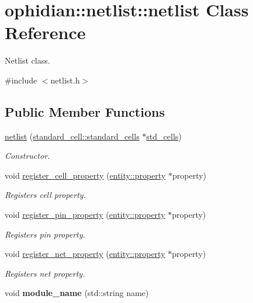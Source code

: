 \hypertarget{classophidian_1_1netlist_1_1netlist}{\section{ophidian\-:\-:netlist\-:\-:netlist Class Reference}
\label{classophidian_1_1netlist_1_1netlist}
}


Netlist class.  




{\ttfamily \#include $<$netlist.\-h$>$}

\subsection*{Public Member Functions}
\begin{DoxyCompactItemize}
\item 
\hyperlink{classophidian_1_1netlist_1_1netlist_aaed1b2653302d1ff92ec1c06f27c3f62}{netlist} (\hyperlink{classophidian_1_1standard__cell_1_1standard__cells}{standard\-\_\-cell\-::standard\-\_\-cells} $\ast$\hyperlink{classophidian_1_1netlist_1_1netlist_a61ec8a8325b9f5d7a476b95cdb2f96c1}{std\-\_\-cells})
\begin{DoxyCompactList}\small\item\em Constructor. \end{DoxyCompactList}\item 
void \hyperlink{classophidian_1_1netlist_1_1netlist_a9750a992e2d181741a3a94d91296e704}{register\-\_\-cell\-\_\-property} (\hyperlink{classophidian_1_1entity_1_1property}{entity\-::property} $\ast$property)
\begin{DoxyCompactList}\small\item\em Registers cell property. \end{DoxyCompactList}\item 
void \hyperlink{classophidian_1_1netlist_1_1netlist_a49ba5eac946171b23f3d001a65023b4f}{register\-\_\-pin\-\_\-property} (\hyperlink{classophidian_1_1entity_1_1property}{entity\-::property} $\ast$property)
\begin{DoxyCompactList}\small\item\em Registers pin property. \end{DoxyCompactList}\item 
void \hyperlink{classophidian_1_1netlist_1_1netlist_aa77943063c4e053486169bfc61bc900e}{register\-\_\-net\-\_\-property} (\hyperlink{classophidian_1_1entity_1_1property}{entity\-::property} $\ast$property)
\begin{DoxyCompactList}\small\item\em Registers net property. \end{DoxyCompactList}\item 
\hypertarget{classophidian_1_1netlist_1_1netlist_a2a425d6fe6441f49f1ca232511c31cbd}{void {\bfseries module\-\_\-name} (std\-::string name)}\label{classophidian_1_1netlist_1_1netlist_a2a425d6fe6441f49f1ca232511c31cbd}


\end{DoxyCompactItemize}
